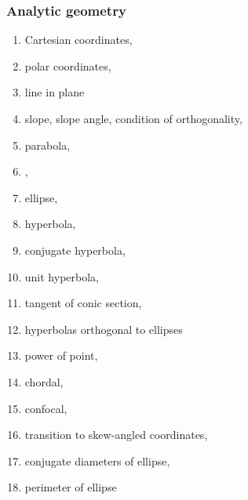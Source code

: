 \documentclass[12pt]{article}
\begin{document}
\subsubsection*{Analytic geometry}
\begin{enumerate}
\item Cartesian coordinates,
\item polar coordinates, 
\item line in plane
\item slope, slope angle, condition of orthogonality,
\item parabola,
\item {},
\item ellipse,
\item hyperbola,
\item conjugate hyperbola,
\item unit hyperbola,
\item tangent of conic section,
\item hyperbolas orthogonal to ellipses
\item power of point,
\item chordal,
\item confocal,
\item transition to skew-angled coordinates,
\item conjugate diameters of ellipse,
\item perimeter of ellipse
\end{enumerate}
\end{document}
